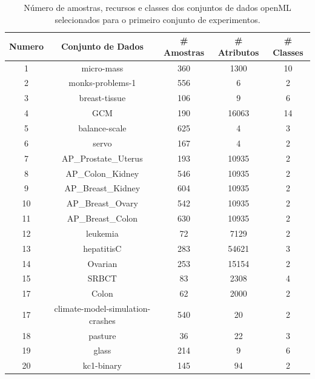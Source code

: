 \documentclass[sn-mathphys,Numbered]{sn-jnl}%
\theoremstyle{thmstyleone}%
\theoremstyle{thmstyletwo}%
\theoremstyle{thmstylethree}%
\begin{document}
\begin{table}[htb]
\centering
\caption{Número de amostras, recursos e classes dos conjuntos de dados openML selecionados para o primeiro conjunto de experimentos.}
\begin{tabular}{ccccc}
\toprule
\textbf{Numero} & \textbf{Conjunto de Dados}  & \textbf{\# Amostras} & \textbf{\# Atributos} & \textbf{\# Classes} \\
\midrule
1  & micro-mass                        & 360   & 1300    & 10 \\
2  & monks-problems-1                  & 556   & 6       & 2  \\
3  & breast-tissue                     & 106   & 9       & 6  \\
4  & GCM                               & 190   & 16063   & 14 \\
5  & balance-scale                     & 625   & 4       & 3  \\
6  & servo                             & 167   & 4       & 2  \\
7  & AP\_Prostate\_Uterus              & 193   & 10935   & 2  \\
8  & AP\_Colon\_Kidney                 & 546   & 10935   & 2  \\
9  & AP\_Breast\_Kidney                & 604   & 10935   & 2  \\
10 & AP\_Breast\_Ovary                 & 542   & 10935   & 2  \\
11 & AP\_Breast\_Colon                 & 630   & 10935   & 2  \\
12 & leukemia                          & 72    & 7129    & 2  \\
13 & hepatitisC                        & 283   & 54621   & 3  \\
14 & Ovarian                           & 253   & 15154   & 2  \\
15 & SRBCT                             & 83    & 2308    & 4  \\
17 & Colon                             & 62    & 2000    & 2  \\
17 & climate-model-simulation-crashes  & 540   & 20      & 2  \\
18 & pasture                           & 36    & 22      & 3  \\
19 & glass                             & 214   & 9       & 6  \\
20 & kc1-binary                        & 145   & 94      & 2  \\

\end{tabular}
\end{table}
\end{document}
